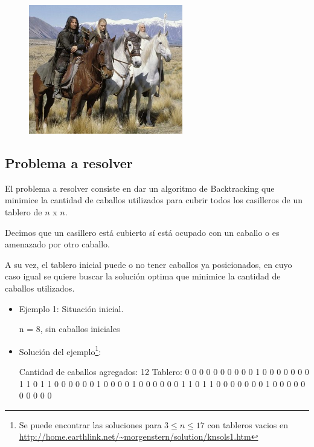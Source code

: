 \begin{figure}[h]
\begin{center}
\includegraphics[width=0.6\textwidth] {imagenes/caballos.jpeg}
\end{center}
\end{figure}

\subsection{Problema a resolver}
El problema a resolver consiste en dar un algoritmo de Backtracking que minimice la cantidad de caballos utilizados para cubrir todos los casilleros de un tablero de $n$ x $n$.

Decimos que un casillero está cubierto sí está ocupado con un caballo o es amenazado por otro caballo.

A su vez, el tablero inicial puede o no tener caballos ya posicionados, en cuyo caso igual se quiere buscar la solución optima que minimice la cantidad de caballos utilizados.

\begin{itemize}
\item Ejemplo 1: Situación inicial.

\begin{codesnippet}
n = 8, sin caballos iniciales
\end{codesnippet}
\item Solución del ejemplo\footnote{Se puede encontrar las soluciones para $3 \leq n \leq 17$ con tableros vacios en \url{http://home.earthlink.net/~morgenstern/solution/knsols1.htm}}:

\begin{codesnippet}
Cantidad de caballos agregados: 12
Tablero:
0 0 0 0 0 0 0 0
0 0 1 0 0 0 0 0
0 0 1 1 0 1 1 0
0 0 0 0 0 1 0 0
0 0 1 0 0 0 0 0
0 1 1 0 1 1 0 0
0 0 0 0 0 1 0 0
0 0 0 0 0 0 0 0
\end{codesnippet}
\end{itemize}

